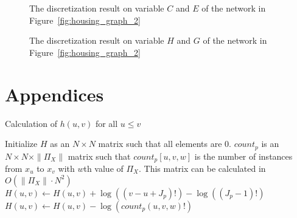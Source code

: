 \begin{figure}[ht]
      
  \caption{The discretization result on variable $C$ and $E$ of the network in Figure~\ref{fig:housing_graph_2}}
  \label{fig:housing_exp2_distr_3_5}
\end{figure}

\begin{figure}[ht]
      
  \caption{The discretization result on variable $H$ and $G$ of the network in Figure~\ref{fig:housing_graph_2}}
  \label{fig:housing_exp2_distr_8_5}
\end{figure}







\section*{Appendices}

\begin{algorithm}
  \caption{ Calculation of $h(u,v)$ for all $u \leq v$}
  \label{alg:h}
  \begin{algorithmic}[1]
  \State Initialize $H$ as an $N \times N$ matrix such that all elements are 0.
  \State $count_p$ is an $N \times N \times \|\Pi_X\|$ matrix such that $count_p [u,v,w]$ is the number of instances from $x_u$ to $x_v$ with $w$th value of $\Pi_X$. This matrix can be calculated in $O(\|\Pi_X\| \cdot N^2)$
      \State $H(u,v) \leftarrow H(u,v) + \log((v-u + J_p)!) - \log((J_p -1)!)$
        \State $H(u,v) \leftarrow H(u,v) - \log( count_p(u,v,w)!)$
      \EndFor
    \EndFor
  \EndFor
    \State {}
  \EndFor
  \end{algorithmic}
\end{algorithm}



